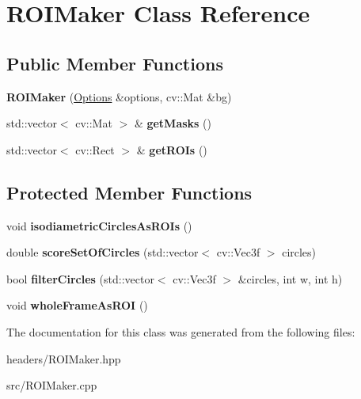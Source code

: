 \hypertarget{classROIMaker}{\section{R\-O\-I\-Maker Class Reference}
\label{classROIMaker}
}
\subsection*{Public Member Functions}
\begin{DoxyCompactItemize}
\item 
\hypertarget{classROIMaker_a245c0f85ebf0ef37bc14c01bec2bfb45}{{\bfseries R\-O\-I\-Maker} (\hyperlink{structOptions}{Options} \&options, cv\-::\-Mat \&bg)}\label{classROIMaker_a245c0f85ebf0ef37bc14c01bec2bfb45}

\item 
\hypertarget{classROIMaker_ad16fba1f6ac07afc673151de0e97bc3c}{std\-::vector$<$ cv\-::\-Mat $>$ \& {\bfseries get\-Masks} ()}\label{classROIMaker_ad16fba1f6ac07afc673151de0e97bc3c}

\item 
\hypertarget{classROIMaker_a12d6ce640f3406c8e97325d6c1a45ca8}{std\-::vector$<$ cv\-::\-Rect $>$ \& {\bfseries get\-R\-O\-Is} ()}\label{classROIMaker_a12d6ce640f3406c8e97325d6c1a45ca8}

\end{DoxyCompactItemize}
\subsection*{Protected Member Functions}
\begin{DoxyCompactItemize}
\item 
\hypertarget{classROIMaker_ae549a9606962d283046d838a4f443474}{void {\bfseries isodiametric\-Circles\-As\-R\-O\-Is} ()}\label{classROIMaker_ae549a9606962d283046d838a4f443474}

\item 
\hypertarget{classROIMaker_ac10ad3702db60f2034b6524557f98c7f}{double {\bfseries score\-Set\-Of\-Circles} (std\-::vector$<$ cv\-::\-Vec3f $>$ circles)}\label{classROIMaker_ac10ad3702db60f2034b6524557f98c7f}

\item 
\hypertarget{classROIMaker_af02f0a56add71814b0ebcf09af2e9f41}{bool {\bfseries filter\-Circles} (std\-::vector$<$ cv\-::\-Vec3f $>$ \&circles, int w, int h)}\label{classROIMaker_af02f0a56add71814b0ebcf09af2e9f41}

\item 
\hypertarget{classROIMaker_a5a58088b1a0218b066fbc2010149c003}{void {\bfseries whole\-Frame\-As\-R\-O\-I} ()}\label{classROIMaker_a5a58088b1a0218b066fbc2010149c003}

\end{DoxyCompactItemize}


The documentation for this class was generated from the following files\-:\begin{DoxyCompactItemize}
\item 
headers/R\-O\-I\-Maker.\-hpp\item 
src/R\-O\-I\-Maker.\-cpp\end{DoxyCompactItemize}
